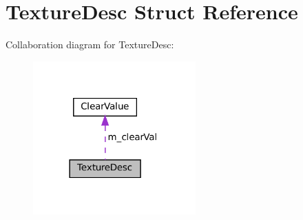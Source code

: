 \hypertarget{structTextureDesc}{}\section{Texture\+Desc Struct Reference}
\label{structTextureDesc}


Collaboration diagram for Texture\+Desc\+:\nopagebreak
\begin{figure}[H]
\begin{center}
\leavevmode
\includegraphics[width=177pt]{structTextureDesc__coll__graph}
\end{center}
\end{figure}
